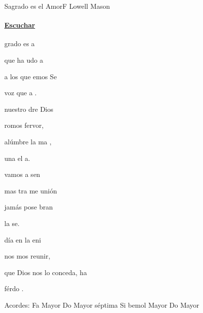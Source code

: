 \documentclass[12pt, spanish]{book}
\begin{document}
    \begin{song}{Sagrado es el Amor}{F}
        {} %
        {Lowell Mason}
        {} %
        {}
        \ifChordBk
        \paragraph{\mbox{}\hfill\protect\href{https://open.spotify.com/intl-es/track/2pr8QSYZjjDvwRMA8qJaVg}{Escuchar}\mbox{}\hfill}
        \fi

        \begin{SBOpGroup}
            grado es  a

            que  ha udo a

            a los que emos  Se

             voz que  a .
        \end{SBOpGroup}

        \begin{SBOpGroup}
             nuestro dre Dios

            romos  fervor,

            alúmbre la ma ,

             una el  a.
        \end{SBOpGroup}

        \begin{SBOpGroup}
             vamos a sen

            mas tra me unión

            jamás pose bran

             la se.
        \end{SBOpGroup}

        \begin{SBOpGroup}
             día en la eni

            nos mos  reunir,

            que Dios nos lo conceda, ha

             férdo .
        \end{SBOpGroup}

        \ifChordBk
        \begin{SBOpGroup}
            Acordes:
            \upchord{\F}\qquad Fa Mayor \hfill
            \upchord{\Cseven}\qquad Do Mayor s\'eptima \hfill\null\break
            \upchord{\Bflat}\qquad Si bemol Mayor \hfill
            \upchord{\C}\qquad Do Mayor \hfill\null\break
        \end{SBOpGroup}
        \fi
    \end{song}
\end{document}
